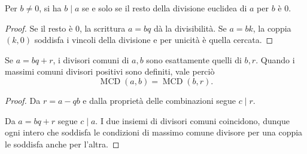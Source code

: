 \begin{corollario}
Per $b\ne0$, si ha $b\mid a$ se e solo se il resto della divisione euclidea di $a$ per $b$ è $0$.
\end{corollario}
\begin{proof}
Se il resto è $0$, la scrittura $a=bq$ dà la divisibilità. Se $a=bk$, la coppia $(k,0)$ soddisfa i vincoli della divisione e per unicità è quella cercata.
\end{proof}

\begin{lemma}\label{lem:passo-euclideo}
Se $a=bq+r$, i divisori comuni di $a,b$ sono esattamente quelli di $b,r$. Quando i massimi comuni divisori positivi sono definiti, vale perciò
\[
\operatorname{MCD}(a,b)=\operatorname{MCD}(b,r).
\]
\end{lemma}
\begin{proof}
 Da $r=a-qb$ e dalla proprietà delle combinazioni segue $c\mid r$.

 Da $a=bq+r$ segue $c\mid a$. I due insiemi di divisori comuni coincidono, dunque ogni intero che soddisfa le condizioni di massimo comune divisore per una coppia le soddisfa anche per l'altra.
\end{proof}


